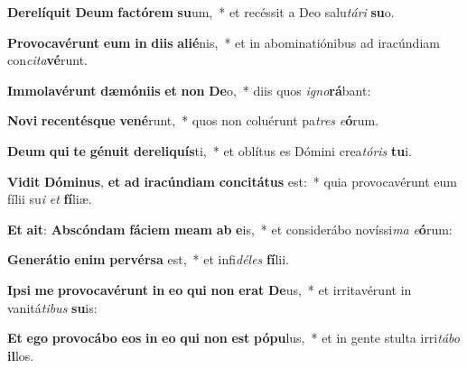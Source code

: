 \item \textbf{De}\textbf{re}\textbf{lí}\textbf{quit} \textbf{De}\textbf{um} \textbf{fac}\textbf{tó}\textbf{rem} \textbf{su}um,~* et recéssit a Deo salu\textit{tá}\textit{ri} \textbf{su}o.
\item \textbf{Pro}\textbf{vo}\textbf{ca}\textbf{vé}\textbf{runt} \textbf{e}\textbf{um} \textbf{in} \textbf{di}\textbf{is} \textbf{a}\textbf{li}\textbf{é}nis,~* et in abominatiónibus ad iracúndiam con\textit{ci}\textit{ta}\textbf{vé}runt.
\item \textbf{Im}\textbf{mo}\textbf{la}\textbf{vé}\textbf{runt} \textbf{dæ}\textbf{mó}\textbf{ni}\textbf{is} \textbf{et} \textbf{non} \textbf{De}o,~* diis quos \textit{i}\textit{gno}\textbf{rá}bant:
\item \textbf{No}\textbf{vi} \textbf{re}\textbf{cen}\textbf{tés}\textbf{que} \textbf{ve}\textbf{né}runt,~* quos non coluérunt pa\textit{tres} \textit{e}\textbf{ó}rum.
\item \textbf{De}\textbf{um} \textbf{qui} \textbf{te} \textbf{gé}\textbf{nu}\textbf{it} \textbf{de}\textbf{re}\textbf{li}\textbf{quís}ti,~* et oblítus es Dómini crea\textit{tó}\textit{ris} \textbf{tu}i.
\item \textbf{Vi}\textbf{dit} \textbf{Dó}\textbf{mi}\textbf{nus}, \textbf{et} \textbf{ad} \textbf{i}\textbf{ra}\textbf{cún}\textbf{di}\textbf{am} \textbf{con}\textbf{ci}\textbf{tá}\textbf{tus} est:~* quia provocavérunt eum fílii su\textit{i} \textit{et} \textbf{fí}liæ.
\item \textbf{Et} \textbf{a}\textbf{it}: \textbf{Abs}\textbf{cón}\textbf{dam} \textbf{fá}\textbf{ci}\textbf{em} \textbf{me}\textbf{am} \textbf{ab} \textbf{e}is,~* et considerábo novíssi\textit{ma} \textit{e}\textbf{ó}rum:
\item \textbf{Ge}\textbf{ne}\textbf{rá}\textbf{ti}\textbf{o} \textbf{e}\textbf{nim} \textbf{per}\textbf{vér}\textbf{sa} est,~* et infi\textit{dé}\textit{les} \textbf{fí}lii.
\item \textbf{Ip}\textbf{si} \textbf{me} \textbf{pro}\textbf{vo}\textbf{ca}\textbf{vé}\textbf{runt} \textbf{in} \textbf{e}\textbf{o} \textbf{qui} \textbf{non} \textbf{e}\textbf{rat} \textbf{De}us,~* et irritavérunt in vanitá\textit{ti}\textit{bus} \textbf{su}is:
\item \textbf{Et} \textbf{e}\textbf{go} \textbf{pro}\textbf{vo}\textbf{cá}\textbf{bo} \textbf{e}\textbf{os} \textbf{in} \textbf{e}\textbf{o} \textbf{qui} \textbf{non} \textbf{est} \textbf{pó}\textbf{pu}lus,~* et in gente stulta irri\textit{tá}\textit{bo} \textbf{il}los.
